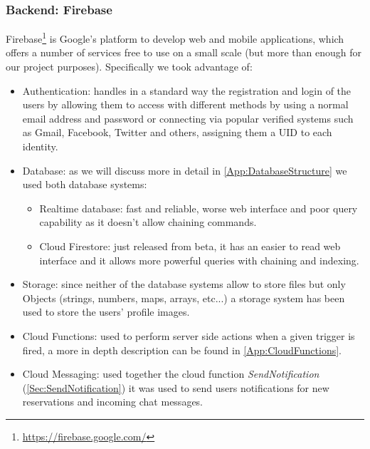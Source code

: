 \subsubsection{Backend: Firebase}
\label{sub:Firebase}
Firebase\footnote{\url{https://firebase.google.com/}} is Google's platform to develop web and mobile applications, which offers a number of services free to use on a small scale (but more than enough for our project purposes). Specifically we took advantage of:
\begin{itemize}
\item Authentication: handles in a standard way the registration and login of the users by allowing them to access with different methods by using a normal email address and password or connecting via popular verified systems such as Gmail, Facebook, Twitter and others, assigning them a UID to each identity.
\item Database: as we will discuss more in detail in \autoref{App:DatabaseStructure} we used both database systems:
	\begin{itemize}
	\item Realtime database: fast and reliable, worse web interface and poor query 	capability as it doesn't allow chaining commands.
	\item Cloud Firestore: just released from beta, it has an easier to read web interface and it allows more powerful queries with 			chaining and indexing.
	\end{itemize}
\item Storage: since neither of the database systems allow to store files but only Objects (strings, numbers, maps, arrays, etc...) a storage system has been used to store the users' profile images.
\item Cloud Functions: used to perform server side actions when a given trigger is fired, a more in depth description can be found in \autoref{App:CloudFunctions}.
\item Cloud Messaging: used together the cloud function \emph{SendNotification} (\autoref{Sec:SendNotification}) it was used to send users notifications for new reservations and incoming chat messages.
\end{itemize}
\clearpage

